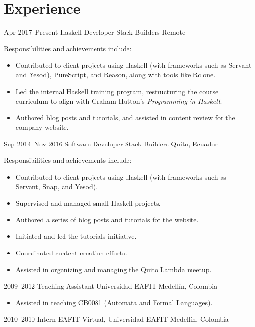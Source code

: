 \documentclass[12pt,letterpaper,sans]{moderncv}
\begin{document}
\makecvtitle

\section{Experience}

\cventry
  {Apr 2017--Present}
  {Haskell Developer}
  {Stack Builders}
  {Remote}
  {}
  {
    Responsibilities and achievements include:
    \begin{itemize}
      \item
        Contributed to client projects using Haskell (with frameworks
        such as Servant and Yesod), PureScript, and Reason, along with
        tools like Rclone.
      \item
        Led the internal Haskell training program, restructuring the
        course curriculum to align with Graham Hutton's
        \textit{Programming in Haskell}.
      \item
        Authored blog posts and tutorials, and assisted in content
        review for the company website.
    \end{itemize}
  }
\cventry
  {Sep 2014--Nov 2016}
  {Software Developer}
  {Stack Builders}
  {Quito, Ecuador}
  {}
  {
    Responsibilities and achievements include:
    \begin{itemize}
      \item
        Contributed to client projects using Haskell (with frameworks
        such as Servant, Snap, and Yesod).
      \item
        Supervised and managed small Haskell projects.
      \item
        Authored a series of blog posts and tutorials for the website.
      \item
        Initiated and led the tutorials initiative.
      \item
        Coordinated content creation efforts.
      \item
        Assisted in organizing and managing the Quito Lambda meetup.
    \end{itemize}
  }
\cventry
  {2009--2012}
  {Teaching Assistant}
  {Universidad EAFIT}
  {Medellín, Colombia}
  {}
  {
    \begin{itemize}
      \item
        Assisted in teaching CB0081 (Automata and Formal Languages).
    \end{itemize}
  }
\cventry
  {2010--2010}
  {Intern}
  {EAFIT Virtual, Universidad EAFIT}
  {Medellín, Colombia}
  {}
  {}
\end{document}
